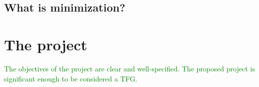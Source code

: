 \subsection{What is minimization?}


%
%
%

\section{The project}
\textcolor{green}{The objectives of the project are
	clear and well-specified. The
	proposed project is significant
	enough to be considered a TFG.
	\\
	\\}

